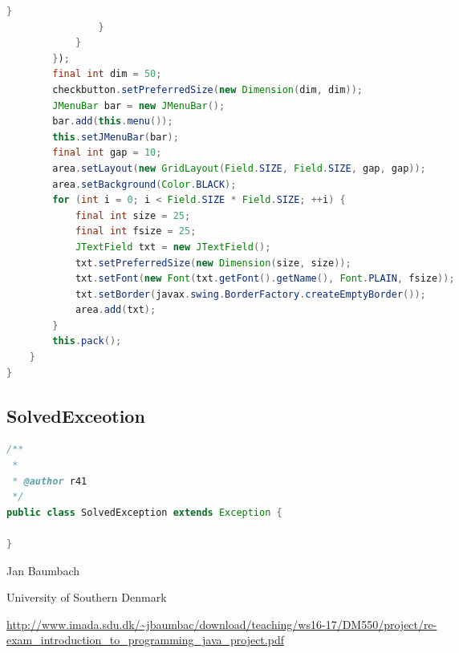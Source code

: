 \documentclass[a4paper,10pt]{article}
\begin{document}
\begin{lstlisting}[language=java]
                    }
                }
            }
        });
        final int dim = 50;
        checkbutton.setPreferredSize(new Dimension(dim, dim));
        JMenuBar bar = new JMenuBar();
        bar.add(this.menu());
        this.setJMenuBar(bar);
        final int gap = 10;
        area.setLayout(new GridLayout(Field.SIZE, Field.SIZE, gap, gap));
        area.setBackground(Color.BLACK);
        for (int i = 0; i < Field.SIZE * Field.SIZE; ++i) {
            final int size = 25;
            final int fsize = 25;
            JTextField txt = new JTextField();
            txt.setPreferredSize(new Dimension(size, size));
            txt.setFont(new Font(txt.getFont().getName(), Font.PLAIN, fsize));
            txt.setBorder(javax.swing.BorderFactory.createEmptyBorder());
            area.add(txt);
        }
        this.pack();
    }
}
\end{lstlisting}

\subsection{SolvedExceotion}
\begin{lstlisting}[language=java]
/**
 *
 * @author r41
 */
public class SolvedException extends Exception {
    
}
\end{lstlisting}

\medskip
 
\begin{thebibliography}{9}
Jan Baumbach 

University of Southern Denmark 

\url{http://www.imada.sdu.dk/~jbaumbac/download/teaching/ws16-17/DM550/project/re-exam_introduction_to_programming_java_project.pdf}
 
\end{thebibliography}
\end{document}
